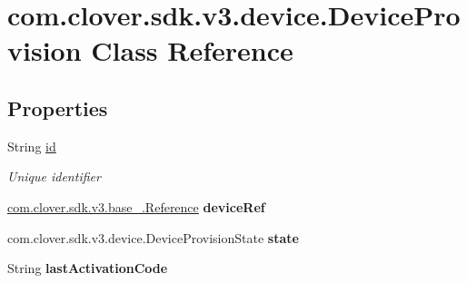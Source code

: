 \hypertarget{classcom_1_1clover_1_1sdk_1_1v3_1_1device_1_1_device_provision}{}\section{com.\+clover.\+sdk.\+v3.\+device.\+Device\+Provision Class Reference}
\label{classcom_1_1clover_1_1sdk_1_1v3_1_1device_1_1_device_provision}
\subsection*{Properties}
\begin{DoxyCompactItemize}
\item 
String \hyperlink{classcom_1_1clover_1_1sdk_1_1v3_1_1device_1_1_device_provision_abab796593b04ec6e752cd56294a61a12}{id}
\begin{DoxyCompactList}\small\item\em Unique identifier \end{DoxyCompactList}\item 
\mbox{\label{classcom_1_1clover_1_1sdk_1_1v3_1_1device_1_1_device_provision_a5ecc0d679d35acdfb450d82bb090e4a3}} 
\hyperlink{classcom_1_1clover_1_1sdk_1_1v3_1_1base___1_1_reference}{com.\+clover.\+sdk.\+v3.\+base\+\_\+.\+Reference} {\bfseries device\+Ref}
\item 
\mbox{\label{classcom_1_1clover_1_1sdk_1_1v3_1_1device_1_1_device_provision_a5119d3d7c23e740cb4906ef3b3f24c83}} 
com.\+clover.\+sdk.\+v3.\+device.\+Device\+Provision\+State {\bfseries state}
\item 
\mbox{\label{classcom_1_1clover_1_1sdk_1_1v3_1_1device_1_1_device_provision_a2a700171bfa038bdf6ab1cc6f085442f}} 
String {\bfseries last\+Activation\+Code}
\item 

\end{DoxyCompactItemize}
